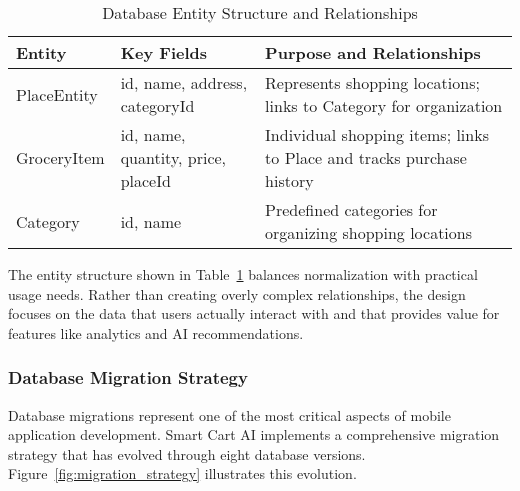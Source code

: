 \documentclass[11pt,a4paper]{article}
\begin{document}
\begin{table}[H]
\centering
\caption{Database Entity Structure and Relationships}
\label{tab:database_entities}
\begin{tabular}{@{}p{2.5cm}p{3cm}p{6cm}@{}}
\toprule
\textbf{Entity} & \textbf{Key Fields} & \textbf{Purpose and Relationships} \\
\midrule
PlaceEntity & id, name, address, categoryId & Represents shopping locations; links to Category for organization \\
GroceryItem & id, name, quantity, price, placeId & Individual shopping items; links to Place and tracks purchase history \\
Category & id, name & Predefined categories for organizing shopping locations \\
\bottomrule
\end{tabular}
\end{table}

The entity structure shown in Table~\ref{tab:database_entities} balances normalization with practical usage needs. Rather than creating overly complex relationships, the design focuses on the data that users actually interact with and that provides value for features like analytics and AI recommendations.

\subsubsection{Database Migration Strategy}

Database migrations represent one of the most critical aspects of mobile application development. Smart Cart AI implements a comprehensive migration strategy that has evolved through eight database versions. Figure~\ref{fig:migration_strategy} illustrates this evolution.
\end{document}
